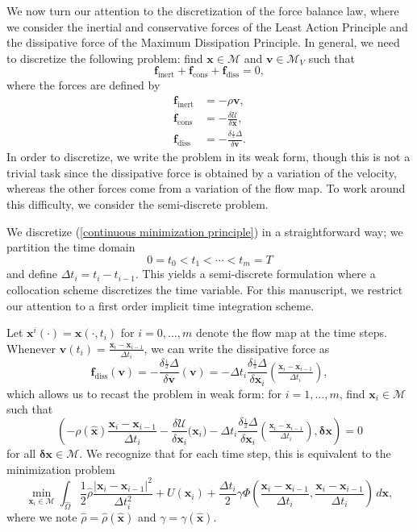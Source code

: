 \documentclass[final,10pt]{article}
\begin{document}
We now turn our attention to the discretization of the force balance law, where we consider the inertial and conservative forces of the Least Action Principle and
the dissipative force of the Maximum Dissipation Principle.
In general, we need to discretize the following problem: find $\bm x \in \mathcal M$ and $\bm v \in \mathcal M_V$ such that
\[
	\bm f_\mathrm{inert} + \bm f_\mathrm{cons} + \bm f_\mathrm{diss} = 0,
\]
where the forces are defined by
\begin{align*}
	\bm f_\mathrm{inert}	&= -\rho \bm v,	\\
	\bm f_\mathrm{cons}	&= -\frac{\delta \mathcal{U}}{\delta \bm x},	\\
	\bm f_\mathrm{diss}	&= -\frac{\delta \frac{_1}{^2} \Delta}{\delta \bm v}.
\end{align*}
In order to discretize, we write the problem in its weak form, though this is not a trivial task since
the dissipative force is obtained by a variation of the velocity, whereas the other forces come from a variation of the flow map.
To work around this difficulty, we consider the semi-discrete problem.


We discretize (\ref{continuous minimization principle}) in a straightforward way;
we partition the time domain
\[
	0 = t_0 < t_1 < \cdots < t_m =T
\]
and define $\Delta t_i = t_i-t_{i-1}$.
This yields a semi-discrete formulation where a collocation scheme discretizes the time variable.
For this manuscript, we restrict our attention to a first order implicit time integration scheme.

Let $\bm x^i(\cdot) = \bm x( \cdot, t_i)$ for $i=0,\ldots,m$ denote the flow map at the time steps.
Whenever ${\bm v}(t_i) = \frac{\bm x_i - \bm x_{i-1}}{\Delta t_i}$, we can write the dissipative force as
\[
	\bm f_\mathrm{diss}(\bm v) 	= -\frac{\delta \frac{_1}{^2} \Delta}{\delta \bm v}(\bm v) 
							= -\Delta t_i \frac{\delta \frac{_1}{^2} \Delta}{\delta \bm x_i}\left(\frac{_{\bm x_i - \bm x_{i-1}}}{^{\Delta t_i}}\right),
\]
which allows us to recast the problem in weak form: for $i=1,\ldots, m$, find $\bm x_i \in \mathcal M$ such that
\[
	\left( -\rho(\hat{\bm x}) \frac{\bm x_i - \bm x_{i-1}}{\Delta t_i} -\frac{\delta \mathcal{U}}{\delta \bm x_i}\big(\bm x_i\big)
			-\Delta t_i \frac{\delta \frac{_1}{^2} \Delta}{\delta \bm x_i}\left(\frac{_{\bm x_i - \bm x_{i-1}}}{^{\Delta t_i}}\right), \bm \delta\bm x\right) =0
\]
for all $\bm \delta \bm x \in \mathcal M$.
We recognize that for each time step, this is equivalent to the minimization problem
\[
	\min_{\bm x_i \in \mathcal M} \int_{\hat{\Omega}} \frac12\hat{\rho}\frac{|\bm x_i - \bm x_{i-1}|^2}{\Delta t_i^2} + U(\bm x_i)
				+ \frac{\Delta t_i}{2}\gamma \Phi\left(\frac{{\bm x_i - \bm x_{i-1}}}{{\Delta t_i}},\frac{{\bm x_i - \bm x_{i-1}}}{{\Delta t_i}}\right)\, d\bm x,
\]
where we note $\hat{\rho} = \hat{\rho}(\hat{\bm x})$ and $\gamma = \gamma(\hat{\bm x})$.
\end{document}
